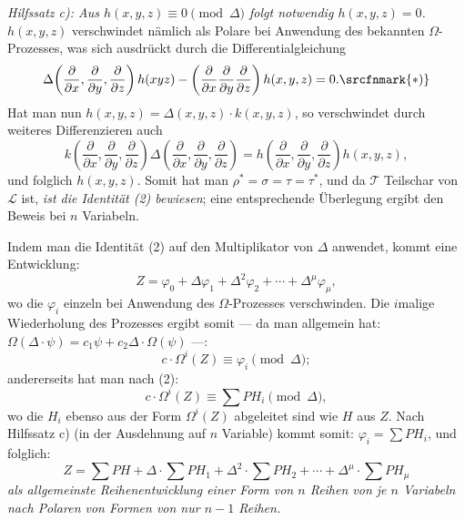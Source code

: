 \emph{Hilfssatz c): Aus $h(x,y,z)\equiv0\pmod{\Delta}$ folgt notwendig $h(x,y,z)=0$.}
$h(x,y,z)$ verschwindet nämlich als Polare bei Anwendung des bekannten $\Omega$-Prozesses, was sich ausdrückt durch die Differentialgleichung
\[
  \Delta\!\left(\frac{\partial}{\partial x},\frac{\partial}{\partial y},\frac{\partial}{\partial z}\right)h(xyz)
  -\left(\frac{\partial}{\partial x}\frac{\partial}{\partial y}\frac{\partial}{\partial z}\right)h(x,y,z)=0.\srcfnmark{*)}
\]
Hat man nun $h(x,y,z)=\Delta(x,y,z)\cdot k(x,y,z)$, so verschwindet durch weiteres Differenzieren auch
\[
  k\!\left(\frac{\partial}{\partial x},\frac{\partial}{\partial y},\frac{\partial}{\partial z}\right)
  \Delta\!\left(\frac{\partial}{\partial x},\frac{\partial}{\partial y},\frac{\partial}{\partial z}\right)
  =
  h\!\left(\frac{\partial}{\partial x},\frac{\partial}{\partial y},\frac{\partial}{\partial z}\right)h(x,y,z),
\]
und folglich $h(x,y,z)$. Somit hat man $\rho^*=\sigma=\tau=\tau^*$, und da $\mathcal T$ Teilschar von $\mathcal L$ ist, \emph{ist die Identität (2) bewiesen}; eine entsprechende Überlegung ergibt den Beweis bei $n$ Variabeln.

Indem man die Identität (2) auf den Multiplikator von $\Delta$ anwendet, kommt eine Entwicklung:
\[
  Z=\varphi_0+\Delta\varphi_1+\Delta^2\varphi_2+\cdots+\Delta^\mu\varphi_\mu,
\]
wo die $\varphi_i$ einzeln bei Anwendung des $\Omega$-Prozesses verschwinden. Die $i$malige Wiederholung des Prozesses ergibt somit --- da man allgemein hat: $\Omega(\Delta\cdot\psi)=c_1\psi+c_2\Delta\cdot\Omega(\psi)$ ---:
\[
  c\cdot \Omega^i(Z)\equiv\varphi_i\pmod{\Delta};
\]
andererseits hat man nach (2):
\[
  c\cdot\Omega^i(Z)\equiv\sum PH_i\pmod{\Delta},
\]
wo die $H_i$ ebenso aus der Form $\Omega^i(Z)$ abgeleitet sind wie $H$ aus $Z$. Nach Hilfssatz c) (in der Ausdehnung auf $n$ Variable) kommt somit: $\varphi_i=\sum PH_i$, und folglich:
\begin{equation}
  Z=\sum PH+\Delta\cdot\sum PH_1+\Delta^2\cdot\sum PH_2+
  \cdots+\Delta^\mu\cdot\sum PH_\mu
\tag{3}
\end{equation}
\emph{als allgemeinste Reihenentwicklung einer Form von $n$ Reihen von je $n$ Variabeln nach Polaren von Formen von nur $n-1$ Reihen.}

